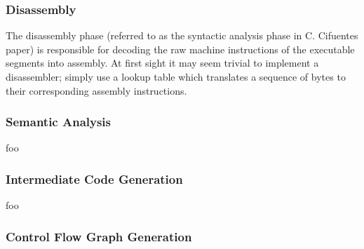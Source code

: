 \documentclass[12pt, a4paper]{article}
\begin{document}
\subsubsection{Disassembly}

The disassembly phase (referred to as the syntactic analysis phase in C. Cifuentes paper) is responsible for decoding the raw machine instructions of the executable segments into assembly. At first sight it may seem trivial to implement a disassembler; simply use a lookup table which translates a sequence of bytes to their corresponding assembly instructions.

%
%
%


\subsubsection{Semantic Analysis}

foo



\subsubsection{Intermediate Code Generation}

foo


\subsubsection{Control Flow Graph Generation}
\end{document}
